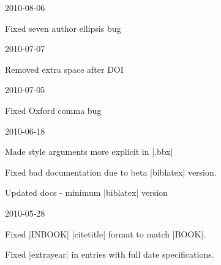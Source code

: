 \documentclass{ltxdockit}
\begin{document}
\begin{changelog}

\begin{release}{1.8}{2010-08-06}
\item Fixed seven author ellipsis bug
\end{release}




\begin{release}{1.4}{2010-07-07}
\item Removed extra space after DOI
\end{release}

\begin{release}{1.3}{2010-07-05}
\item Fixed Oxford comma bug
\end{release}

\begin{release}{1.2}{2010-06-18}
\item Made style arguments more explicit in |.bbx|
\item Fixed bad documentation due to beta |biblatex| version.
\item Updated docs - minimum |biblatex| version
\end{release}

\begin{release}{1.1}{2010-05-28}
\item Fixed |INBOOK| |citetitle| format to match |BOOK|.
\item Fixed |extrayear| in entries with full date specifications.
\end{release}


\end{changelog}
\end{document}
